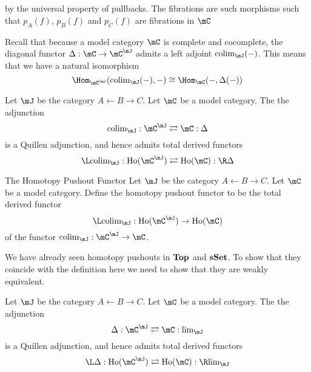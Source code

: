 \documentclass[a4paper]{article}
\begin{document}
\begin{prp}{}{}
\begin{itemize}
\\~\\
by the universal property of pullbacks. The fibrations are such morphisms such that $p_A(f)$, $p_B(f)$ and $p_C(f)$ are fibrations in $\mC$
\end{itemize}
\end{prp}

Recall that because a model category $\mC$ is complete and cocomplete, the diagonal functor $\Delta:\mC\to\mC^\mJ$ admits a left adjoint $\text{colim}_\mJ(-)$. This means that we have a natural isomorphism $$\Hom_{\mC^\mJ}(\text{colim}_\mJ(-),-)\cong\Hom_\mC(-,\Delta(-))$$

\begin{prp}{}{} Let $\mJ$ be the category $A\leftarrow B\rightarrow C$. Let $\mC$ be a model category. The the adjunction $$\text{colim}_\mJ:\mC^\mJ\rightleftarrows\mC:\Delta$$ is a Quillen adjunction, and hence admits total derived functors $$\L\text{colim}_\mJ:\text{Ho}(\mC^\mJ)\rightleftarrows\text{Ho}(\mC):\R\Delta$$
\end{prp}

\begin{defn}{The Homotopy Pushout Functor}{} Let $\mJ$ be the category $A\leftarrow B\rightarrow C$. Let $\mC$ be a model category. Define the homotopy pushout functor to be the total derived functor $$\L\text{colim}_\mJ:\text{Ho}(\mC^\mJ)\to\text{Ho}(\mC)$$ of the functor $\text{colim}_\mJ:\mC^\mJ\to\mC$. 
\end{defn}

We have already seen homotopy pushouts in $\bold{Top}$ and $\bold{sSet}$. To show that they coincide with the definition here we need to show that they are weakly equivalent. 

\begin{prp}{}{} Let $\mJ$ be the category $A\leftarrow B\rightarrow C$. Let $\mC$ be a model category. The the adjunction $$\Delta:\mC^\mJ\rightleftarrows\mC:\text{lim}_\mJ$$ is a Quillen adjunction, and hence admits total derived functors $$\L\Delta:\text{Ho}(\mC^\mJ)\rightleftarrows\text{Ho}(\mC):\R\text{lim}_\mJ$$
\end{prp}
\end{document}
